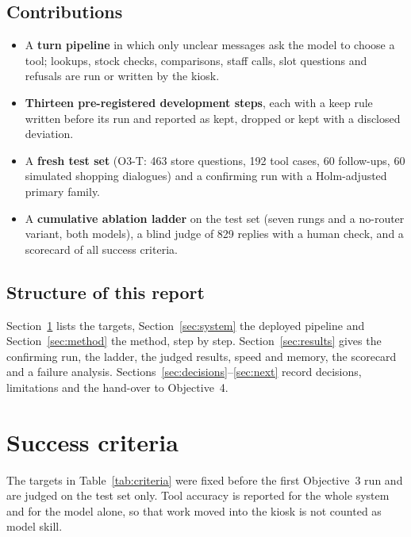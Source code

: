 \documentclass[11pt,a4paper]{article}
\begin{document}
\subsection{Contributions}
\begin{itemize}
  \item A \textbf{turn pipeline} in which only unclear messages ask the model to choose a tool; lookups, stock checks,
        comparisons, staff calls, slot questions and refusals are run or written by the kiosk.
  \item \textbf{Thirteen pre-registered development steps}, each with a keep rule written before its run and reported
        as kept, dropped or kept with a disclosed deviation.
  \item A \textbf{fresh test set} (O3-T: 463 store questions, 192 tool cases, 60 follow-ups, 60 simulated shopping
        dialogues) and a confirming run with a Holm-adjusted primary family.
  \item A \textbf{cumulative ablation ladder} on the test set (seven rungs and a no-router variant, both models), a blind
        judge of 829 replies with a human check, and a scorecard of all success criteria.
\end{itemize}

\subsection{Structure of this report}
Section~\ref{sec:criteria} lists the targets, Section~\ref{sec:system} the deployed pipeline and Section~\ref{sec:method}
the method, step by step. Section~\ref{sec:results} gives the confirming run, the ladder, the judged results, speed and
memory, the scorecard and a failure analysis. Sections~\ref{sec:decisions}--\ref{sec:next} record decisions, limitations
and the hand-over to Objective~4.

\section{Success criteria}\label{sec:criteria}
The targets in Table~\ref{tab:criteria} were fixed before the first Objective~3 run and are judged on the test set only.
Tool accuracy is reported for the whole system and for the model alone, so that work moved into the kiosk is not
counted as model skill.
\end{document}
